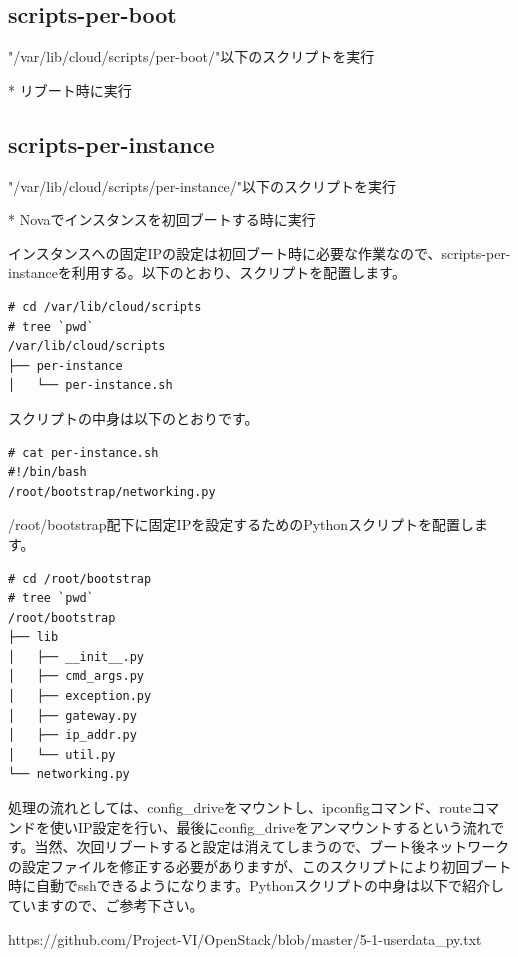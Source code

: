 \documentclass[8pt,b5paper,tombo,openany]{jsbook}
\begin{document}
\subsection{scripts-per-boot}

"/var/lib/cloud/scripts/per-boot/"以下のスクリプトを実行

* リブート時に実行

\subsection{scripts-per-instance}

"/var/lib/cloud/scripts/per-instance/"以下のスクリプトを実行

* Novaでインスタンスを初回ブートする時に実行

インスタンスへの固定IPの設定は初回ブート時に必要な作業なので、scripts-per-instanceを利用する。以下のとおり、スクリプトを配置します。

\begin{verbatim}
# cd /var/lib/cloud/scripts
# tree `pwd`
/var/lib/cloud/scripts
├── per-instance
│   └── per-instance.sh
\end{verbatim}

スクリプトの中身は以下のとおりです。

\begin{lstlisting}
# cat per-instance.sh
#!/bin/bash
/root/bootstrap/networking.py
\end{lstlisting}

/root/bootstrap配下に固定IPを設定するためのPythonスクリプトを配置します。

{\footnotesize
\begin{verbatim}
# cd /root/bootstrap
# tree `pwd`
/root/bootstrap
├── lib
│   ├── __init__.py
│   ├── cmd_args.py
│   ├── exception.py
│   ├── gateway.py
│   ├── ip_addr.py
│   └── util.py
└── networking.py
\end{verbatim}
}

処理の流れとしては、config\_driveをマウントし、ipconfigコマンド、routeコマンドを使いIP設定を行い、最後にconfig\_driveをアンマウントするという流れです。当然、次回リブートすると設定は消えてしまうので、ブート後ネットワークの設定ファイルを修正する必要がありますが、このスクリプトにより初回ブート時に自動でsshできるようになります。Pythonスクリプトの中身は以下で紹介していますので、ご参考下さい。

https://github.com/Project-VI/OpenStack/blob/master/5-1-userdata\_py.txt

\stopcontents[sections]
\end{document}
